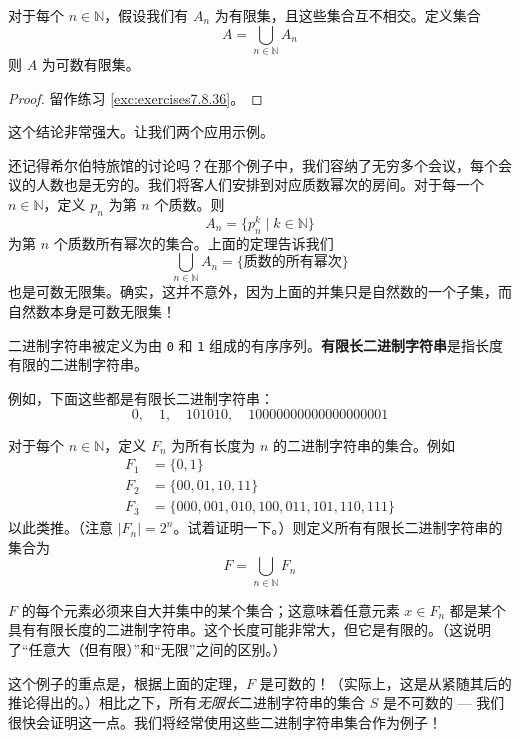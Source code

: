 \begin{corollary}\label{corollary7.6.23}
    对于每个 $n \in \mathbb{N}$，假设我们有 $A_n$ 为有限集，且这些集合互不相交。定义集合
    \[A = \bigcup_{n \in \mathbb{N}} A_n\]
    则 $A$ 为可数有限集。
\end{corollary}

\begin{proof}
    留作练习 \ref{exc:exercises7.8.36}。
\end{proof}

这个结论非常强大。让我们两个应用示例。\\

\begin{example}[所有质数幂次的集合]
    还记得希尔伯特旅馆的讨论吗？在那个例子中，我们容纳了无穷多个会议，每个会议的人数也是无穷的。我们将客人们安排到对应质数幂次的房间。对于每一个 $n \in \mathbb{N}$，定义 $p_n$ 为第 $n$ 个质数。则
    \[A_n = \{p_n^k \mid k \in \mathbb{N}\}\]
    为第 $n$ 个质数所有幂次的集合。上面的定理告诉我们
    \[\bigcup_{n \in \mathbb{N}} A_n = \{\text{质数的所有幂次}\}\]
    也是可数无限集。确实，这并不意外，因为上面的并集只是自然数的一个子集，而自然数本身是可数无限集！
\end{example}

\begin{example}[所有有限长二进制字符串的集合]\label{ex:example7.6.25}
    二进制字符串被定义为由 \verb|0| 和 \verb|1| 组成的有序序列。\textbf{有限长二进制字符串}是指长度有限的二进制字符串。

    例如，下面这些都是有限长二进制字符串：
    \[0, \quad 1, \quad 101010, \quad 10000000000000000001 \]

    对于每个 $n \in \mathbb{N}$，定义 $F_n$ 为所有长度为 $n$ 的二进制字符串的集合。例如
    \begin{align*}
        F_1 & = \{ 0 , 1 \}                                         \\
        F_2 & = \{ 00 , 01 , 10 , 11 \}                             \\
        F_3 & = \{ 000 , 001 , 010 , 100 , 011 , 101 , 110 , 111 \}
    \end{align*}
    以此类推。（注意 $|F_n| = 2^n$。试着证明一下。）则定义所有有限长二进制字符串的集合为
    \[F = \bigcup_{n \in \mathbb{N}} F_n\]

    $F$ 的每个元素必须来自大并集中的某个集合；这意味着任意元素 $x \in F_n$ 都是某个具有有限长度的二进制字符串。这个长度可能非常大，但它是有限的。（这说明了``任意大（但有限）''和``无限''之间的区别。）

    这个例子的重点是，根据上面的定理，$F$ 是可数的！（实际上，这是从紧随其后的推论得出的。）相比之下，所有\emph{无限长}二进制字符串的集合 $S$ 是不可数的 --- 我们很快会证明这一点。我们将经常使用这些二进制字符串集合作为例子！
\end{example}

